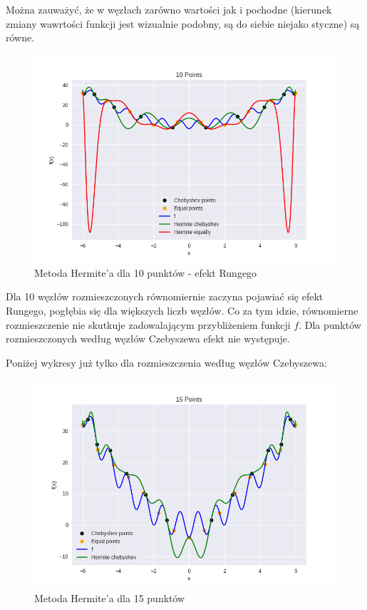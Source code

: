 \documentclass{article}
\begin{document}
Można zauważyć, że w węzłach zarówno wartości jak i pochodne (kierunek zmiany wawrtości funkcji jest wizualnie podobny,
są do siebie niejako styczne) są równe.

\begin{figure}[H]
    \centering
    \includegraphics[width=\textwidth]{img/herm_10.png}
    \caption{Metoda Hermite'a dla 10 punktów - efekt Rungego}
\end{figure}

Dla 10 węzłów rozmieszczonych równomiernie zaczyna pojawiać się efekt Rungego, pogłębia się dla większych liczb węzłów.
Co za tym idzie, równomierne rozmieszczenie nie skutkuje zadowalającym przybliżeniem funkcji $f$. 
Dla punktów rozmieszczonych według węzłów Czebyszewa efekt nie występuje.

Poniżej wykresy już tylko dla rozmieszczenia według węzłów Czebyszewa:

\begin{figure}[H]
    \centering
    \includegraphics[width=\textwidth]{img/herm_15.png}
    \caption{Metoda Hermite'a dla 15 punktów}
\end{figure}
\end{document}
